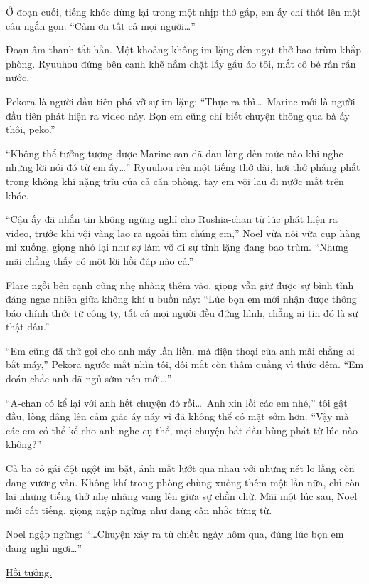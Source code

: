\documentclass[../main.tex]{subfiles}
\begin{document}
Ở đoạn cuối, tiếng khóc dừng lại trong một nhịp thở gấp, em ấy chỉ thốt lên một câu ngắn gọn: ``Cảm ơn tất cả mọi người\dots''

Đoạn âm thanh tắt hẳn. Một khoảng không im lặng đến ngạt thở bao trùm khắp phòng. Ryuuhou đứng bên cạnh khẽ nắm chặt lấy gấu áo tôi, mắt cô bé rấn rấn nước.

Pekora là người đầu tiên phá vỡ sự im lặng: ``Thực ra thì\dots\ Marine mới là người đầu tiên phát hiện ra video này. Bọn em cũng chỉ biết chuyện thông qua bà ấy thôi, peko.''

``Không thể tưởng tượng được Marine-san đã đau lòng đến mức nào khi nghe những lời nói đó từ em ấy\dots'' Ryuuhou rên một tiếng thở dài, hơi thở phảng phất trong không khí nặng trĩu của cả căn phòng, tay em vội lau đi nước mắt trên khóe.

``Cậu ấy đã nhắn tin không ngừng nghỉ cho Rushia-chan từ lúc phát hiện ra video, trước khi vội vàng lao ra ngoài tìm chúng em,'' Noel vừa nói vừa cụp hàng mi xuống, giọng nhỏ lại như sợ làm vỡ đi sự tĩnh lặng đang bao trùm. ``Nhưng mãi chẳng thấy có một lời hồi đáp nào cả.''

Flare ngồi bên cạnh cũng nhẹ nhàng thêm vào, giọng vẫn giữ được sự bình tĩnh đáng ngạc nhiên giữa không khí u buồn này: ``Lúc bọn em mới nhận được thông báo chính thức từ công ty, tất cả mọi người đều đứng hình, chẳng ai tin đó là sự thật đâu.''

``Em cũng đã thử gọi cho anh mấy lần liền, mà điện thoại của anh mãi chẳng ai bắt máy,'' Pekora ngước mắt nhìn tôi, đôi mắt còn thâm quầng vì thức đêm. ``Em đoán chắc anh đã ngủ sớm nên mới\dots''

``A-chan có kể lại với anh hết chuyện đó rồi\dots\ Anh xin lỗi các em nhé,'' tôi gật đầu, lòng dâng lên cảm giác áy náy vì đã không thể có mặt sớm hơn. ``Vậy mà các em có thể kể cho anh nghe cụ thể, mọi chuyện bắt đầu bùng phát từ lúc nào không?''

Cả ba cô gái đột ngột im bặt, ánh mắt lướt qua nhau với những nét lo lắng còn đang vương vấn. Không khí trong phòng chùng xuống thêm một lần nữa, chỉ còn lại những tiếng thở nhẹ nhàng vang lên giữa sự chần chừ. Mãi một lúc sau, Noel mới cất tiếng, giọng ngập ngừng như đang cân nhắc từng từ.

Noel ngập ngừng: ``\dots Chuyện xảy ra từ chiều ngày hôm qua, đúng lúc bọn em đang nghỉ ngơi\dots''

\begin{center}
    \uline{Hồi tưởng.}
\end{center}
\end{document}
